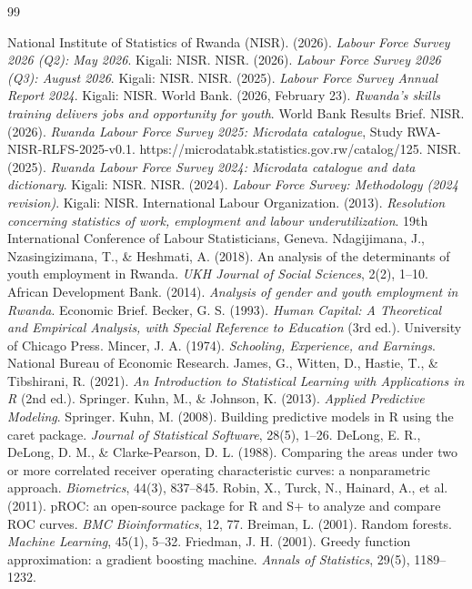 \documentclass[11pt,a4paper]{article}
\begin{document}
\begin{thebibliography}{99}
\small
{} National Institute of Statistics of Rwanda (NISR). (2026). \emph{Labour Force Survey 2026 (Q2): May 2026}. Kigali: NISR.
 NISR. (2026). \emph{Labour Force Survey 2026 (Q3): August 2026}. Kigali: NISR.
 NISR. (2025). \emph{Labour Force Survey Annual Report 2024}. Kigali: NISR.
 World Bank. (2026, February 23). \emph{Rwanda's skills training delivers jobs and opportunity for youth}. World Bank Results Brief.
 NISR. (2026). \emph{Rwanda Labour Force Survey 2025: Microdata catalogue}, Study RWA-NISR-RLFS-2025-v0.1. https://microdatabk.statistics.gov.rw/catalog/125.
 NISR. (2025). \emph{Rwanda Labour Force Survey 2024: Microdata catalogue and data dictionary}. Kigali: NISR.
 NISR. (2024). \emph{Labour Force Survey: Methodology (2024 revision)}. Kigali: NISR.
 International Labour Organization. (2013). \emph{Resolution concerning statistics of work, employment and labour underutilization}. 19th International Conference of Labour Statisticians, Geneva.
 Ndagijimana, J., Nzasingizimana, T., \& Heshmati, A. (2018). An analysis of the determinants of youth employment in Rwanda. \emph{UKH Journal of Social Sciences}, 2(2), 1--10.
 African Development Bank. (2014). \emph{Analysis of gender and youth employment in Rwanda}. Economic Brief.
 Becker, G. S. (1993). \emph{Human Capital: A Theoretical and Empirical Analysis, with Special Reference to Education} (3rd ed.). University of Chicago Press.
 Mincer, J. A. (1974). \emph{Schooling, Experience, and Earnings}. National Bureau of Economic Research.
 James, G., Witten, D., Hastie, T., \& Tibshirani, R. (2021). \emph{An Introduction to Statistical Learning with Applications in R} (2nd ed.). Springer.
 Kuhn, M., \& Johnson, K. (2013). \emph{Applied Predictive Modeling}. Springer.
 Kuhn, M. (2008). Building predictive models in R using the caret package. \emph{Journal of Statistical Software}, 28(5), 1--26.
 DeLong, E. R., DeLong, D. M., \& Clarke-Pearson, D. L. (1988). Comparing the areas under two or more correlated receiver operating characteristic curves: a nonparametric approach. \emph{Biometrics}, 44(3), 837--845.
 Robin, X., Turck, N., Hainard, A., et al. (2011). pROC: an open-source package for R and S+ to analyze and compare ROC curves. \emph{BMC Bioinformatics}, 12, 77.
 Breiman, L. (2001). Random forests. \emph{Machine Learning}, 45(1), 5--32.
 Friedman, J. H. (2001). Greedy function approximation: a gradient boosting machine. \emph{Annals of Statistics}, 29(5), 1189--1232.
\end{thebibliography}
\end{document}

